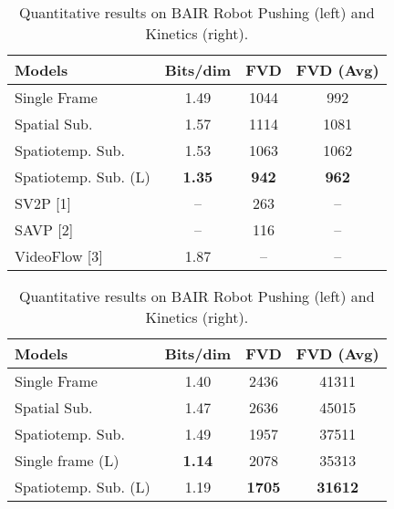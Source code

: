\documentclass{article} \usepackage{iclr2020_conference,times}
\begin{document}
\begin{table}
    \label{tab:results}
    \scriptsize
    \centering
    \caption{Quantitative results on BAIR Robot Pushing (left) and Kinetics (right).}
    \begin{subtable}[t]{0.48\textwidth}
        \centering
        \begin{tabular}{lccc}
\toprule
            \textbf{Models} & Bits/dim & FVD & FVD (Avg) \\
            \midrule
            Single Frame & 1.49 & 1044 & \phantom{1}992 \\
            Spatial Sub. & 1.57 & 1114 & 1081\\
            Spatiotemp. Sub. & 1.53 & 1063 & 1062\\
\midrule  
            Spatiotemp. Sub. (L) & \bf{1.35} & \bf{\phantom{1}942} & \bf{\phantom{1}962} \\
            \midrule
SV2P [1] & -- & 263 & -- \\
            SAVP [2] & -- & 116 & -- \\ VideoFlow [3] & 1.87 & -- & -- \\
            \bottomrule
        \end{tabular}
        \label{tab:robotic_pushing}
    \end{subtable}
    \hspace{\fill}
    \begin{subtable}[t]{0.48\textwidth}
        \centering
        \begin{tabular}{l c c c}
\toprule
            \textbf{Models} & Bits/dim & FVD & FVD (Avg) \\
            \midrule
            Single Frame & 1.40 & 2436 & 41311 \\ 
            Spatial Sub. & 1.47 & 2636 & 45015 \\
            Spatiotemp. Sub. & 1.49 & 1957 & 37511 \\
            \midrule
Single frame (L) & \bf{1.14} & 2078 & 35313 \\
            Spatiotemp. Sub. (L) & 1.19 & \bf{1705} & \bf{31612} \\
            \bottomrule
        \end{tabular}
        \label{tab:kinetics}
    \end{subtable}
\end{table}
\end{document}
